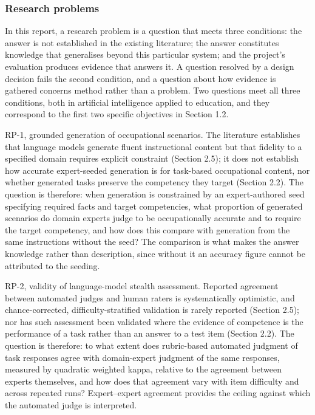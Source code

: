 \subsubsection{Research problems}

In this report, a research problem is a question that meets three conditions: the answer is not established in the existing literature; the answer constitutes knowledge that generalises beyond this particular system; and the project's evaluation produces evidence that answers it. A question resolved by a design decision fails the second condition, and a question about how evidence is gathered concerns method rather than a problem. Two questions meet all three conditions, both in artificial intelligence applied to education, and they correspond to the first two specific objectives in Section 1.2.

RP-1, grounded generation of occupational scenarios. The literature establishes that language models generate fluent instructional content but that fidelity to a specified domain requires explicit constraint (Section 2.5); it does not establish how accurate expert-seeded generation is for task-based occupational content, nor whether generated tasks preserve the competency they target (Section 2.2). The question is therefore: when generation is constrained by an expert-authored seed specifying required facts and target competencies, what proportion of generated scenarios do domain experts judge to be occupationally accurate and to require the target competency, and how does this compare with generation from the same instructions without the seed? The comparison is what makes the answer knowledge rather than description, since without it an accuracy figure cannot be attributed to the seeding.

RP-2, validity of language-model stealth assessment. Reported agreement between automated judges and human raters is systematically optimistic, and chance-corrected, difficulty-stratified validation is rarely reported (Section 2.5); nor has such assessment been validated where the evidence of competence is the performance of a task rather than an answer to a test item (Section 2.2). The question is therefore: to what extent does rubric-based automated judgment of task responses agree with domain-expert judgment of the same responses, measured by quadratic weighted kappa, relative to the agreement between experts themselves, and how does that agreement vary with item difficulty and across repeated runs? Expert--expert agreement provides the ceiling against which the automated judge is interpreted.

